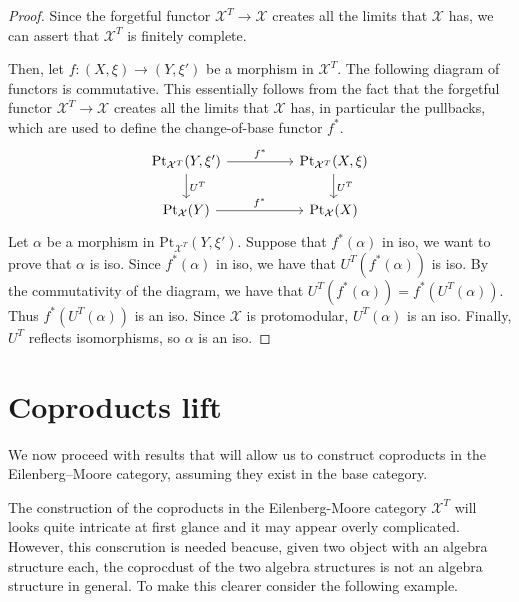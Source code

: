 \begin{subbox}{}
    \begin{proof}
        Since the forgetful functor $\mathcal{X}^T \to \mathcal{X}$ creates all the limits that $\mathcal{X}$ has, we can assert that $\mathcal{X}^T$ is finitely complete.

        Then, let $f:(X,\xi) \to (Y,\xi')$ be a morphism in $\mathcal{X}^T$. The following diagram of functors is commutative. This essentially follows from the fact that the forgetful functor $\mathcal{X}^T \to \mathcal{X}$ creates all the limits that $\mathcal{X}$ has, in particular the pullbacks, which are used to define the change-of-base functor $f^*$.
        \[
\begin{tikzcd}
    {\mathrm{Pt}_{\mathcal{X}^T}(Y,\xi')} \arrow[rr, "f^*"] \arrow[d, "U^T"] &  & {\mathrm{Pt}_{\mathcal{X}^T}(X,\xi)} \arrow[d, "U^T"] \\
    \mathrm{Pt}_{\mathcal{X}}(Y) \arrow[rr, "f^*"]                           &  & \mathrm{Pt}_{\mathcal{X}}(X)                         
    \end{tikzcd}
    \]
    Let $\alpha$ be a morphism in $\mathrm{Pt}_{\mathcal{X}^T}(Y,\xi')$. Suppose that $f^*(\alpha)$ in iso, we want to prove that $\alpha$ is iso. Since $f^*(\alpha)$ in iso, we have that $U^T(f^*(\alpha))$ is iso. By the commutativity of the diagram, we have that $U^T(f^*(\alpha)) = f^*(U^T(\alpha))$. Thus $f^*(U^T(\alpha))$ is an iso. Since $\mathcal{X}$ is protomodular, $U^T(\alpha)$ is an iso. Finally, $U^T$ reflects isomorphisms, so $\alpha$ is an iso.
    \end{proof}
\end{subbox}

\section{Coproducts lift}

We now proceed with results that will allow us to construct coproducts in the Eilenberg–Moore category, assuming they exist in the base category. 

The construction of the coproducts in the Eilenberg-Moore category $\mathcal{X}^T$ will looks quite intricate at first glance and it may appear overly complicated. However, this conscrution is needed beacuse, given two object with an algebra structure each, the coprocdust of the two algebra structures is not an algebra structure in general. To make this clearer consider the following example.

